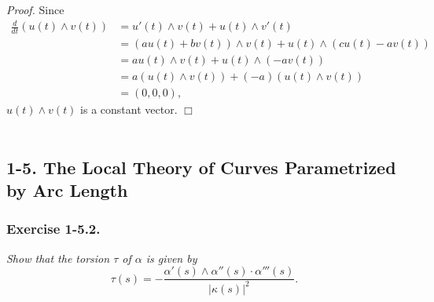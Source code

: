 \documentclass{article}
\begin{document}
\emph{Proof.}
Since
\begin{align*}
  \frac{d}{dt}(u(t) \wedge v(t))
  &= u'(t) \wedge v(t) + u(t) \wedge v'(t) \\
  &= (au(t) + bv(t))\wedge v(t) + u(t) \wedge (cu(t) - av(t)) \\
  &= au(t) \wedge v(t) + u(t) \wedge (-av(t)) \\
  &= a(u(t) \wedge v(t)) + (-a)(u(t) \wedge v(t)) \\
  &= (0, 0, 0),
\end{align*}
$u(t) \wedge v(t)$ is a constant vector.
$\Box$ \\\\






\subsection*{1-5. The Local Theory of Curves Parametrized by Arc Length \\}



\subsubsection*{Exercise 1-5.2.}
\emph{Show that the torsion $\tau$ of $\alpha$ is given by
$$\tau(s) = -\frac{\alpha'(s) \wedge \alpha''(s) \cdot \alpha'''(s)}{|\kappa(s)|^2}.$$} \\
\end{document}
